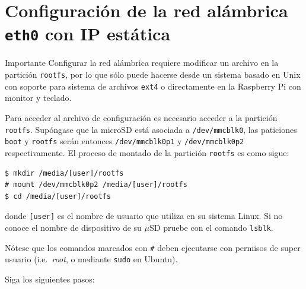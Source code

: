\documentclass[letterpaper,10.5pt]{article}
\begin{document}
%
%
\appendix%
\section{Configuración de la red alámbrica \texttt{eth0} con IP estática}%
\label{sec:setup-eth0}

\begin{importantbox}{Importante}
Configurar la red alámbrica requiere modificar un archivo en la partición \texttt{rootfs}, por lo que sólo puede hacerse desde un sistema basado en Unix con soporte para sistema de archivos \texttt{ext4} o directamente en la Raspberry Pi con monitor y teclado.
\end{importantbox}

Para acceder al archivo de configuración es necesario acceder a la partición \texttt{rootfs}.
Supóngase que la microSD está asociada a \texttt{/dev/mmcblk0}, las paticiones \texttt{boot} y \texttt{rootfs} serán entonces \texttt{/dev/mmcblk0p1} y \texttt{/dev/mmcblk0p2} respectivamente.
El proceso de montado de la partición \texttt{rootfs} es como sigue:

\begin{Verbatim}[fontsize=\footnotesize]
$ mkdir /media/[user]/rootfs
# mount /dev/mmcblk0p2 /media/[user]/rootfs
$ cd /media/[user]/rootfs
\end{Verbatim}

\noindent donde \texttt{[user]} es el nombre de usuario que utiliza en su sistema Linux.
Si no conoce el nombre de dispositivo de su $\mu$SD pruebe con el comando \texttt{lsblk}.

Nótese que los comandos marcados con \texttt{\#} deben ejecutarse con permisos de super usuario (i.e.~\emph{root}, o mediante \texttt{sudo} en Ubuntu).

Siga los siguientes pasos:
\end{document}
